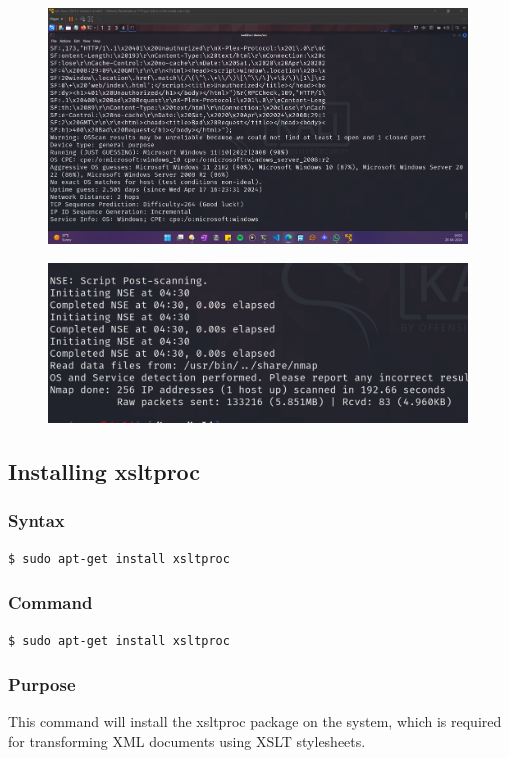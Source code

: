 \documentclass[11pt]{article}
\begin{document}
\begin{figure}[H]
    \centering
    \includegraphics[width=0.99\textwidth]{a4 (2).png}
\end{figure}
\begin{figure}[H]
    \centering
    \includegraphics[width=0.99\textwidth]{a4 (3).png}
\end{figure}
\subsection{Installing xsltproc}

\subsubsection*{Syntax}
\begin{verbatim}
$ sudo apt-get install xsltproc
\end{verbatim}

\subsubsection*{Command}
\begin{verbatim}
$ sudo apt-get install xsltproc
\end{verbatim}

\subsubsection*{Purpose}
This command will install the xsltproc package on the system, which is required for transforming XML documents using XSLT stylesheets.
\end{document}
